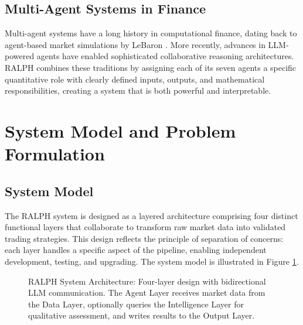 \documentclass[conference]{IEEEtran}
\begin{document}
\subsection{Multi-Agent Systems in Finance}
Multi-agent systems have a long history in computational finance, dating back to agent-based market simulations by LeBaron \cite{lebaron2006agent}. More recently, advances in LLM-powered agents have enabled sophisticated collaborative reasoning architectures. RALPH combines these traditions by assigning each of its seven agents a specific quantitative role with clearly defined inputs, outputs, and mathematical responsibilities, creating a system that is both powerful and interpretable.

\section{System Model and Problem Formulation}
\label{sec:system_model}

\subsection{System Model}

The RALPH system is designed as a layered architecture comprising four distinct functional layers that collaborate to transform raw market data into validated trading strategies. This design reflects the principle of separation of concerns: each layer handles a specific aspect of the pipeline, enabling independent development, testing, and upgrading. The system model is illustrated in Figure \ref{fig:system_model}.

\begin{figure}[h!]
\centering
{}
\caption{RALPH System Architecture: Four-layer design with bidirectional LLM communication. The Agent Layer receives market data from the Data Layer, optionally queries the Intelligence Layer for qualitative assessment, and writes results to the Output Layer.}
\label{fig:system_model}
\end{figure}
\end{document}
